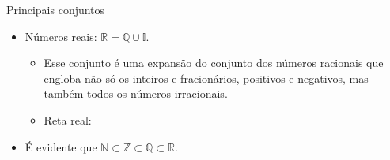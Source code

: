 \documentclass[14pt, aspectratio=169]{beamer}
\newcommand{\R}{\mathbb{R}}
\newcommand{\I}{\mathbb{I}}
\newcommand{\Q}{\mathbb{Q}}
\newcommand{\Z}{\mathbb{Z}}
\newcommand{\N}{\mathbb{N}}
\begin{document}
\begin{frame}[allowframebreaks]{Principais conjuntos}
\begin{itemize}
    \vspace{5.0cm}

    \item Números reais: $\R = \Q \cup \I$.
    \begin{itemize}
        \item Esse conjunto é uma expansão do conjunto dos números racionais que engloba não só os inteiros e fracionários, positivos e negativos, mas também todos os números irracionais.
        \item Reta real: \\ 
        \vspace{0.25cm}
    \end{itemize}

    \vspace{5.0cm}

    \item É evidente que $\N \subset \Z \subset \Q \subset \R$.
\end{itemize}
\end{frame}
\end{document}
